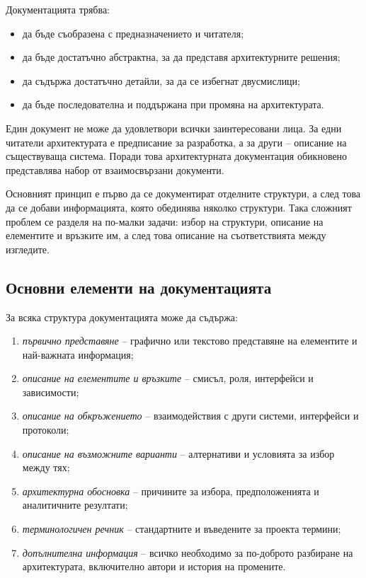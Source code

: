 Документацията трябва:

\begin{itemize}
    \item да бъде съобразена с предназначението и читателя;
    \item да бъде достатъчно абстрактна, за да представя архитектурните решения;
    \item да съдържа достатъчно детайли, за да се избегнат двусмислици;
    \item да бъде последователна и поддържана при промяна на архитектурата.
\end{itemize}

Един документ не може да удовлетвори всички заинтересовани лица. За едни читатели архитектурата е предписание за разработка, а за други -- описание на съществуваща система. Поради това архитектурната документация обикновено представлява набор от взаимосвързани документи.

Основният принцип е първо да се документират отделните структури, а след това да се добави информацията, която обединява няколко структури. Така сложният проблем се разделя на по-малки задачи: избор на структури, описание на елементите и връзките им, а след това описание на съответствията между изгледите.

\subsection{Основни елементи на документацията}\label{s:27.8.2}

За всяка структура документацията може да съдържа:

\begin{enumerate}
    \item \emph{първично представяне} -- графично или текстово представяне на елементите и най-важната информация;
    \item \emph{описание на елементите и връзките} -- смисъл, роля, интерфейси и зависимости;
    \item \emph{описание на обкръжението} -- взаимодействия с други системи, интерфейси и протоколи;
    \item \emph{описание на възможните варианти} -- алтернативи и условията за избор между тях;
    \item \emph{архитектурна обосновка} -- причините за избора, предположенията и аналитичните резултати;
    \item \emph{терминологичен речник} -- стандартните и въведените за проекта термини;
    \item \emph{допълнителна информация} -- всичко необходимо за по-доброто разбиране на архитектурата, включително автори и история на промените.
\end{enumerate}

